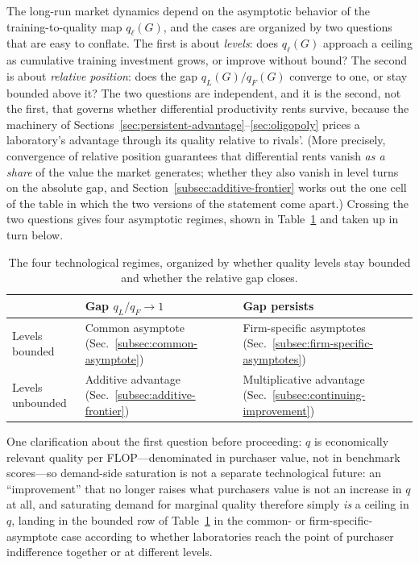 \documentclass[11pt]{article}
\begin{document}
The long-run market dynamics depend on the asymptotic behavior of the training-to-quality map $q_\ell(G)$, and the cases are organized by two questions that are easy to conflate. The first is about \emph{levels}: does $q_\ell(G)$ approach a ceiling as cumulative training investment grows, or improve without bound? The second is about \emph{relative position}: does the gap $q_L(G)/q_F(G)$ converge to one, or stay bounded above it? The two questions are independent, and it is the second, not the first, that governs whether differential productivity rents survive, because the machinery of Sections~\ref{sec:persistent-advantage}--\ref{sec:oligopoly} prices a laboratory's advantage through its quality relative to rivals'. (More precisely, convergence of relative position guarantees that differential rents vanish \emph{as a share} of the value the market generates; whether they also vanish in level turns on the absolute gap, and Section~\ref{subsec:additive-frontier} works out the one cell of the table in which the two versions of the statement come apart.) Crossing the two questions gives four asymptotic regimes, shown in Table~\ref{tab:regime-grid} and taken up in turn below.

\begin{table}[htbp]
\centering
\caption{The four technological regimes, organized by whether quality levels stay bounded and whether the relative gap closes.}
\label{tab:regime-grid}
\begin{tabular}{lll}
\hline
 & Gap $q_L/q_F\rightarrow1$ & Gap persists \\
\hline
Levels bounded & Common asymptote (Sec.~\ref{subsec:common-asymptote}) & Firm-specific asymptotes (Sec.~\ref{subsec:firm-specific-asymptotes}) \\
Levels unbounded & Additive advantage (Sec.~\ref{subsec:additive-frontier}) & Multiplicative advantage (Sec.~\ref{subsec:continuing-improvement}) \\
\hline
\end{tabular}
\end{table}

One clarification about the first question before proceeding: $q$ is economically relevant quality per FLOP---denominated in purchaser value, not in benchmark scores---so demand-side saturation is not a separate technological future: an ``improvement'' that no longer raises what purchasers value is not an increase in $q$ at all, and saturating demand for marginal quality therefore simply \emph{is} a ceiling in $q$, landing in the bounded row of Table~\ref{tab:regime-grid} in the common- or firm-specific-asymptote case according to whether laboratories reach the point of purchaser indifference together or at different levels.
\end{document}
